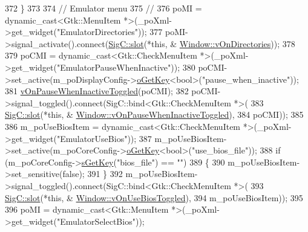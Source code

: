 \begin{DoxyCode}
{{372   \}
373 
374   \textcolor{comment}{// Emulator menu}
375   \textcolor{comment}{//}
376   poMI = \textcolor{keyword}{dynamic\_cast<}Gtk::MenuItem *\textcolor{keyword}{>}(\_poXml->get\_widget(\textcolor{stringliteral}{"EmulatorDirectories"}));
377   poMI->signal\_activate().connect(\mbox{\hyperlink{namespace_sig_c_a92e4f19202b77e78ac1db05f5a62f6b6}{SigC::slot}}(*\textcolor{keyword}{this}, &
      \mbox{\hyperlink{class_v_b_a_1_1_window_ab0ff6c3b3ac5df7ab482be673ac02732}{Window::vOnDirectories}}));
378 
379   poCMI = \textcolor{keyword}{dynamic\_cast<}Gtk::CheckMenuItem *\textcolor{keyword}{>}(\_poXml->get\_widget(\textcolor{stringliteral}{"EmulatorPauseWhenInactive"}));
380   poCMI->set\_active(m\_poDisplayConfig->\mbox{\hyperlink{class_v_b_a_1_1_config_1_1_section_ab169d7aae4e9dde91418ba1668e3ad39}{oGetKey}}<\textcolor{keywordtype}{bool}>(\textcolor{stringliteral}{"pause\_when\_inactive"}));
381   \mbox{\hyperlink{class_v_b_a_1_1_window_aec8ba72231d668912f3b71353925f2f2}{vOnPauseWhenInactiveToggled}}(poCMI);
382   poCMI->signal\_toggled().connect(SigC::bind<Gtk::CheckMenuItem *>(
383                                     \mbox{\hyperlink{namespace_sig_c_a92e4f19202b77e78ac1db05f5a62f6b6}{SigC::slot}}(*\textcolor{keyword}{this}, &
      \mbox{\hyperlink{class_v_b_a_1_1_window_aec8ba72231d668912f3b71353925f2f2}{Window::vOnPauseWhenInactiveToggled}}),
384                                     poCMI));
385 
386   m\_poUseBiosItem = \textcolor{keyword}{dynamic\_cast<}Gtk::CheckMenuItem *\textcolor{keyword}{>}(\_poXml->get\_widget(\textcolor{stringliteral}{"EmulatorUseBios"}));
387   m\_poUseBiosItem->set\_active(m\_poCoreConfig->\mbox{\hyperlink{class_v_b_a_1_1_config_1_1_section_ab169d7aae4e9dde91418ba1668e3ad39}{oGetKey}}<\textcolor{keywordtype}{bool}>(\textcolor{stringliteral}{"use\_bios\_file"}));
388   \textcolor{keywordflow}{if} (m\_poCoreConfig->\mbox{\hyperlink{class_v_b_a_1_1_config_1_1_section_a7ac9dfabf38bc1db83a6017e130f04ac}{sGetKey}}(\textcolor{stringliteral}{"bios\_file"}) == \textcolor{stringliteral}{""})
389   \{
390     m\_poUseBiosItem->set\_sensitive(\textcolor{keyword}{false});
391   \}
392   m\_poUseBiosItem->signal\_toggled().connect(SigC::bind<Gtk::CheckMenuItem *>(
393                                               \mbox{\hyperlink{namespace_sig_c_a92e4f19202b77e78ac1db05f5a62f6b6}{SigC::slot}}(*\textcolor{keyword}{this}, &
      \mbox{\hyperlink{class_v_b_a_1_1_window_a4c3cba9990c0f7315b49d2c8d338280b}{Window::vOnUseBiosToggled}}),
394                                               m\_poUseBiosItem));
395 
396   poMI = \textcolor{keyword}{dynamic\_cast<}Gtk::MenuItem *\textcolor{keyword}{>}(\_poXml->get\_widget(\textcolor{stringliteral}{"EmulatorSelectBios"}));
}}
\end{DoxyCode}
